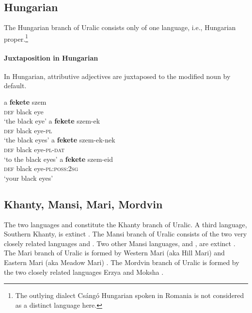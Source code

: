 \subsection{Hungarian}
The Hungarian branch of Uralic consists only of one language, i.e., Hungarian proper.\footnote{The outlying dialect Csángó Hungarian spoken in Romania is not considered as a distinct language here.}

\paragraph*{Juxtaposition in Hungarian}
In Hungarian, attributive adjectives are juxtaposed to the modified noun by default.
\begin{exe}
\label{hung juxt}
\begin{xlist}
\ex 
\gll	a \textbf{fekete} szem\\
	\textsc{def} black eye\\
\glt	‘the black eye’
\ex	
\gll	a \textbf{fekete} szem-ek\\
	\textsc{def} black eye-\textsc{pl}\\
\glt	‘the black eyes’
\ex
\gll	a \textbf{fekete} szem-ek-nek\\
	\textsc{def} black eye-\textsc{pl}-\textsc{dat}\\
\glt	‘to the black eyes’
\ex
\gll	a \textbf{fekete} szem-eid\\
	\textsc{def} black eye-\textsc{pl:poss:2sg}\\
\glt	‘your black eyes’
\end{xlist}
\end{exe}

\subsection{Khanty, Mansi, Mari, Mordvin}
The two languages  and  constitute the Khanty branch of Uralic. A third language, Southern Khanty, is extinct \citep[231]{salminen2007}. The Mansi branch of Uralic consists of the two very closely related languages  and . Two other Mansi languages,  and , are extinct \citep[231]{salminen2007}. The Mari branch of Uralic is formed by Western Mari (aka Hill Mari) and Eastern Mari (aka Meadow Mari) \citep[231]{salminen2007}. The Mordvin branch of Uralic is formed by the two closely related languages Erzya and Moksha  \citep[231]{salminen2007}.

